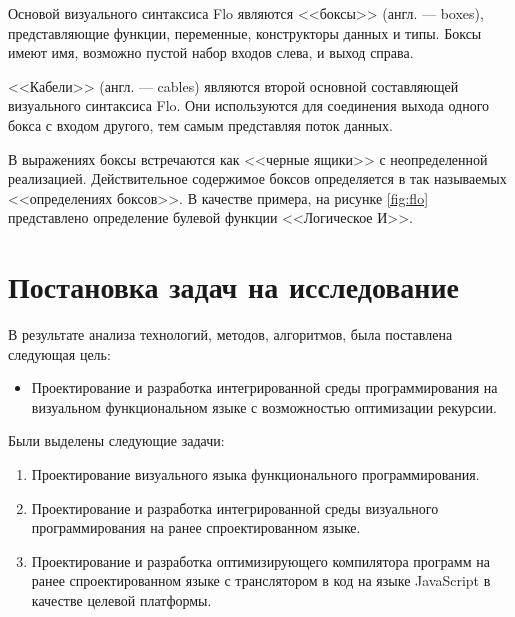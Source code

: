\FloatBarrier

Основой визуального синтаксиса Flo являются <<боксы>> (англ. --- boxes), 
представляющие функции, переменные, конструкторы данных и типы. 
Боксы имеют имя, возможно пустой набор входов слева, и выход справа.

<<Кабели>> (англ. --- cables) являются второй основной составляющей
визуального синтаксиса Flo. Они используются для соединения выхода
одного бокса с входом другого, тем самым представляя поток данных.

В выражениях боксы встречаются как <<черные ящики>> с неопределенной
реализацией. Действительное содержимое боксов определяется в так
называемых <<определениях боксов>>. В качестве примера, на рисунке
\ref{fig:flo} представлено определение булевой функции <<Логическое И>>.

\section{Постановка задач на исследование}\label{sec:ch1/sec9}

В результате анализа технологий, методов, алгоритмов, была поставлена следующая цель:

\begin{itemize}
    \item Проектирование и разработка интегрированной среды программирования на визуальном функциональном языке с возможностью оптимизации рекурсии.
\end{itemize}

Были выделены следующие задачи:

\begin{enumerate}
    \item Проектирование визуального языка функционального программирования.
    \item Проектирование и разработка интегрированной среды визуального программирования на ранее спроектированном языке.
    \item Проектирование и разработка оптимизирующего компилятора программ на ранее спроектированном языке с транслятором в код на языке JavaScript в качестве целевой платформы.
\end{enumerate}

\nocite{*}

\FloatBarrier
